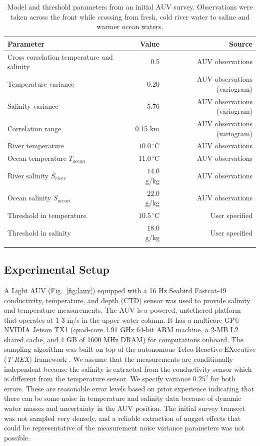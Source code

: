 \documentclass[aoas]{imsart}
\begin{document}
\begin{table}[!h]
\centering
\begin{tabular}{lrr}
\toprule
Parameter & Value & Source\\
\midrule
\rowcolor{Gray}
Cross correlation temperature and salinity & 0.5 & AUV observations\\
Temperature variance &  0.20 & AUV observations (variogram)\\
\rowcolor{Gray}
Salinity variance &  5.76 & AUV observations (variogram)\\
Correlation range  & 0.15 km & AUV observations (variogram)\\
\rowcolor{Gray}
River temperature  & $10.0\,^{\circ}\mathrm{C}$ & AUV observations\\
Ocean temperature $T_{ocean}$ & $11.0\,^{\circ}\mathrm{C}$ & AUV observations\\
\rowcolor{Gray}
River salinity $S_{river}$ & $14.0$ g/kg & AUV observations\\
Ocean salinity $S_{ocean}$ & $22.0$ g/kg & AUV observations\\
\rowcolor{Gray}
Threshold in temperature & $10.5\,^{\circ}\mathrm{C}$ & User specified \\
Threshold in salinity & $18.0$ g/kg & User specified \\
\rowcolor{Gray}
\bottomrule
\end{tabular}
\caption{Model and threshold parameters from an initial AUV
  survey. Observations were taken across the front while crossing from
  fresh, cold river water to saline and warmer ocean waters.}
\label{tab:experiment_param}
\end{table}


\subsection{Experimental Setup}

A Light AUV \citep{sousa2012lauv} (Fig.~\ref{fig:lauv}) equipped with
a 16 Hz Seabird Fastcat-49 conductivity, temperature, and depth (CTD)
sensor was used to provide salinity and temperature measurements.  The
AUV is a powered, untethered platform that operates at $1$-$3$ m/s in
the upper water column. It has a multicore GPU NVIDIA Jetson TX1
(quad-core 1.91 GHz 64-bit ARM machine, a 2-MB L2 shared cache, and 4
GB of 1600 MHz DRAM) for computations onboard.  The sampling algorithm
was built on top of the autonomous Teleo-Reactive EXecutive
(\textit{T-REX}) framework \citep{py10,Rajan12,Rajan12b}. We assume
that the measurements are conditionally independent because the
salinity is extracted from the conductivity sensor which is different
from the temperature sensor. We specify variance $0.25^2$ for both
errors. These are reasonable error levels based on prior experience \citep{fossuminformation} indicating that there can be
some noise in temperature and salinity data because of
dynamic water masses and uncertainty in the AUV position. The initial
survey transect was not sampled very densely, and a reliable extraction
of nugget effects that could be representative of the measurement noise variance parameters was not possible.
\end{document}
